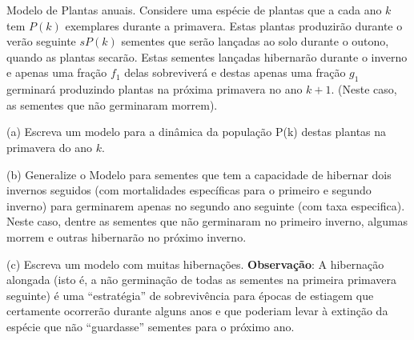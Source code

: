     \begin{exercise}
    Modelo de Plantas anuais. Considere uma espécie de plantas que a cada ano \(k\) tem \(P(k)\) exemplares durante a primavera. Estas plantas produzirão durante o verão seguinte \(s P(k)\) sementes que serão lançadas ao solo durante o outono, quando as plantas secarão. Estas sementes lançadas hibernarão durante o inverno e apenas uma fração \(f_1\) delas sobreviverá e destas apenas uma fração \(g_1\) germinará produzindo plantas na próxima primavera no ano \(k + 1\). (Neste caso, as sementes que não germinaram morrem).

    \begin{description}
    \item (a) Escreva um modelo para a dinâmica da população P(k) destas plantas na primavera do ano \(k\).
    \item (b) Generalize o Modelo para sementes que tem a capacidade de hibernar dois invernos seguidos (com mortalidades específicas para o primeiro e segundo inverno) para germinarem apenas no segundo ano seguinte (com taxa especifica). Neste caso, dentre as sementes que não germinaram no primeiro inverno, algumas morrem e outras hibernarão no próximo inverno.
    \item (c) Escreva um modelo com muitas hibernações.
    \textbf{Observação}: A hibernação alongada (isto é, a não germinação de todas as sementes na primeira primavera seguinte) é uma ``estratégia'' de sobrevivência para épocas de estiagem que certamente ocorrerão durante alguns anos e que poderiam levar à extinção da espécie que não ``guardasse'' sementes para o próximo ano.
    \end{description}
    \end{exercise}
    
